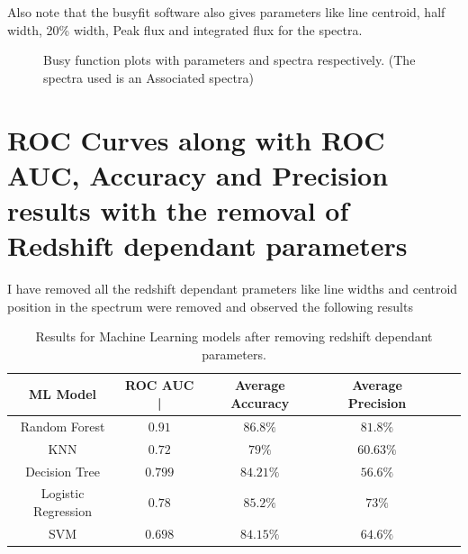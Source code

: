 \documentclass{article}
\begin{document}
Also note that the busyfit software also gives parameters like line centroid, half width, 20\% width, Peak flux and integrated flux for the spectra.

\begin{figure}[h]%
    \centering
    \qquad
    \caption{Busy function plots with parameters and spectra respectively. (The spectra used is an Associated spectra)}%
    \label{fig:1}%
\end{figure}
\section*{ROC Curves along with ROC AUC, Accuracy and Precision results with the removal of Redshift dependant parameters}

I have removed all the redshift dependant prameters like line widths and centroid position in the spectrum were removed and observed the following results

\begin{table}[h] 
  \centering
  \begin{tabular}{@{}cc@{}cc@{}cc@{}}
    \toprule
    ML Model & ROC AUC  | & Average Accuracy & Average Precision  \\
    \midrule
    Random Forest & $0.91$ & $86.8\%$ & $81.8\%$ \\
    KNN & $0.72$ & $79\%$ & $60.63\%$ \\
    Decision Tree & $0.799$ & $84.21\%$ & $56.6\%$ \\
    Logistic Regression & $0.78$ & $85.2\%$ & $73\%$ \\
    SVM & $0.698$ & $84.15\%$ & $64.6\%$ \\
    \bottomrule
  \end{tabular}
  \caption{Results for Machine Learning models after removing redshift dependant parameters.}
  \label{results}
\end{table}
\end{document}
